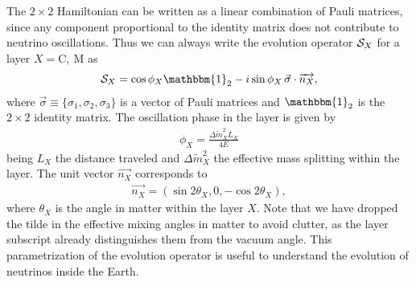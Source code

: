 The $2\times2$ Hamiltonian can be written as a linear combination of Pauli matrices, since any component proportional to the identity matrix does not contribute to neutrino oscillations. Thus we can always write the evolution operator ${\cal S}_X$ for a layer $X = \mathrm{C,\ M}$ as~\cite{Akhmedov:1998ui,Akhmedov:1998xq,Chizhov:1998ug,Chizhov:1999az,Chizhov:1999he}
\begin{align}
	{\cal S}_X = \cos \phi_X \mathbbm{1}_2- i\sin \phi_X \, \vec{\sigma}\cdot\overrightarrow{n_X},
\end{align}
where  $\vec{\sigma}\equiv\{\sigma_1,\sigma_2,\sigma_3\}$ is a vector of Pauli matrices and $\mathbbm{1}_2$ is the $2\times 2$ identity matrix.
The oscillation phase in the layer is given by
\begin{align*}
\phi_X = \frac{\Delta\widetilde m_{X}^2 L_X}{4E}
\end{align*}
being $L_X$ the distance traveled and $\Delta\widetilde m_{X}^2$ the effective mass splitting  within the layer. 
The unit vector $ \overrightarrow{n_X}$ corresponds to
\begin{align}
	\overrightarrow{n_X} = (\sin 2\theta_X, 0, -\cos 2 \theta_X),
\end{align}
where $\theta_X$ is the angle in matter within the layer $X$.
Note that we have dropped the tilde in the effective mixing angles in matter to avoid clutter, as the layer subscript already distinguishes them from the vacuum angle.
This parametrization of the evolution operator is useful to understand the evolution of neutrinos inside the Earth. 

